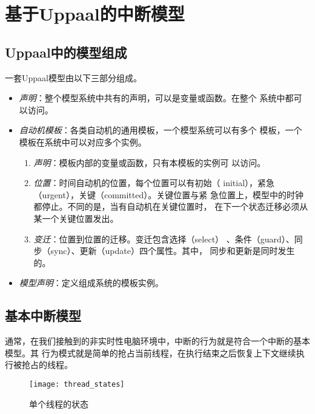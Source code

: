 
\chapter{基于Uppaal的中断模型}
\label{cha:intr}

\section{Uppaal中的模型组成}
\label{sec:model_combine}	
一套Uppaal模型由以下三部分组成。
\begin{itemize}
	\item \emph{声明}：整个模型系统中共有的声明，可以是变量或函数。在整个
	系统中都可以访问。
	\item \emph{自动机模板}：各类自动机的通用模板，一个模型系统可以有多个
	模板，一个模板在系统中可以对应多个实例。
		\begin{enumerate}[(1)]
			\item \emph{声明}：模板内部的变量或函数，只有本模板的实例可
			以访问。
			\item \emph{位置}：时间自动机的位置，每个位置可以有初始（
			initial），紧急（urgent），关键（committed）。关键位置与紧
			急位置上，模型中的时钟都停止。不同的是，当有自动机在关键位置时，
			在下一个状态迁移必须从某一个关键位置发出。
			\item \emph{变迁}：位置到位置的迁移。变迁包含选择（select）
			、条件（guard）、同步（sync）、更新（update）四个属性。其中，
			同步和更新是同时发生的。
		\end{enumerate}	
	\item \emph{模型声明}：定义组成系统的模板实例。
\end{itemize}

\section{基本中断模型}
\label{sec:basic}
通常，在我们接触到的非实时性电脑环境中，中断的行为就是符合一个中断的基本模型。其
行为模式就是简单的抢占当前线程，在执行结束之后恢复上下文继续执行被抢占的线程。

\begin{figure}[H]
	\centering
	\texttt{[image: thread\_states]}
	\caption{单个线程的状态}
	\label{fig:thread_state}
\end{figure}

